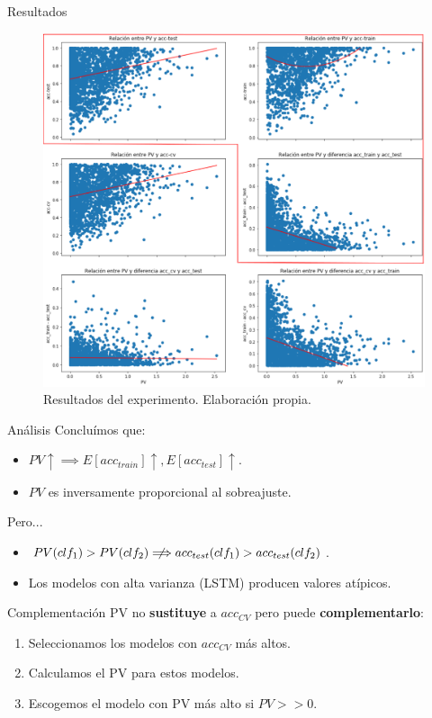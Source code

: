 \documentclass[spanish]{beamer}
\begin{document}
\begin{frame}{Resultados}
  \begin{figure}
    \centering
    \includegraphics[width=.74\textwidth]{img/res-pv}
    \caption{Resultados del experimento. Elaboración propia.}
  \end{figure}
\end{frame}

\begin{frame}{Análisis}
  Concluímos que:
  \begin{itemize}
    \item $PV \uparrow \implies E[acc_{train}]\uparrow, E[acc_{test}] \uparrow$.
    \item $PV$ es inversamente proporcional al sobreajuste.
  \end{itemize}
  \pause

  Pero...
  \begin{itemize}
    \item $PV(clf_1) > PV(clf_2) \centernot\Longrightarrow acc_{test}(clf_1) > acc_{test}(clf_2)$.
    \item Los modelos con alta varianza (LSTM) producen valores atípicos.
  \end{itemize}

\end{frame}

\begin{frame}{Complementación}
  PV no \textbf{sustituye} a $acc_{CV}$ pero puede \textbf{complementarlo}:
  \begin{enumerate}
    \item Seleccionamos los modelos con $acc_{CV}$ más altos.
    \item Calculamos el PV para estos modelos.
    \item Escogemos el modelo con PV más alto si $PV >> 0$.
  \end{enumerate}
\end{frame}
\end{document}
